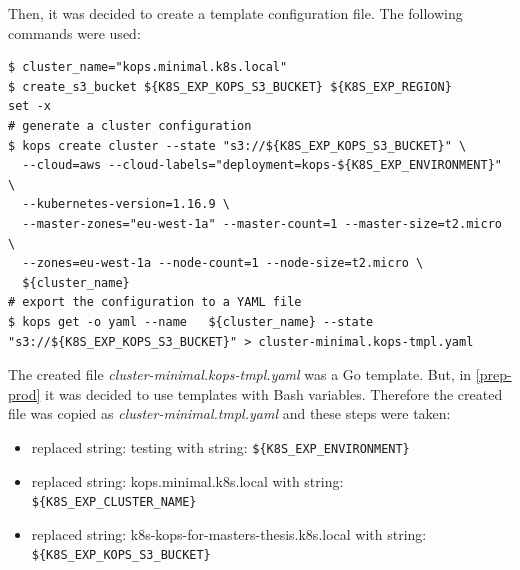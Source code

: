Then, it was decided to create a template configuration file. The following commands were used:
\begin{lstlisting}[caption={Commands used to generate kops configuration}]
$ cluster_name="kops.minimal.k8s.local"
$ create_s3_bucket ${K8S_EXP_KOPS_S3_BUCKET} ${K8S_EXP_REGION}
set -x
# generate a cluster configuration
$ kops create cluster --state "s3://${K8S_EXP_KOPS_S3_BUCKET}" \
  --cloud=aws --cloud-labels="deployment=kops-${K8S_EXP_ENVIRONMENT}" \
  --kubernetes-version=1.16.9 \
  --master-zones="eu-west-1a" --master-count=1 --master-size=t2.micro \
  --zones=eu-west-1a --node-count=1 --node-size=t2.micro \
  ${cluster_name}
# export the configuration to a YAML file
$ kops get -o yaml --name   ${cluster_name} --state "s3://${K8S_EXP_KOPS_S3_BUCKET}" > cluster-minimal.kops-tmpl.yaml
\end{lstlisting}

The created file \textit{cluster-minimal.kops-tmpl.yaml} was a Go template\cite{online-kops-ct}. But, in \ref{prep-prod} it was decided to use templates with Bash variables. Therefore the created file was copied as \textit{cluster-minimal.tmpl.yaml} and these steps were taken:
\begin{itemize}
\item replaced string: testing with string: \verb|${K8S_EXP_ENVIRONMENT}|
\item replaced string: kops.minimal.k8s.local with string: \verb|${K8S_EXP_CLUSTER_NAME}|
\item replaced string: k8s-kops-for-masters-thesis.k8s.local with string: \verb|${K8S_EXP_KOPS_S3_BUCKET}|
\end{itemize}

